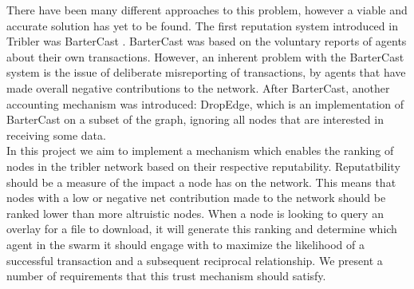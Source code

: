 \documentclass[twocolumn]{article}
\theoremstyle{definition}
\theoremstyle{theorem}
\begin{document}
\noindent There have been many different approaches to this problem, however a viable and accurate solution has yet to be found. The first reputation system introduced in Tribler was BarterCast \cite{Bartercast: A practical approach to prevent lazy freeriding in p2p networks}. BarterCast was based on the voluntary reports of agents about their own transactions. However, an inherent problem with the BarterCast system is the issue of deliberate misreporting of transactions, by agents that have made overall negative contributions to the network. After BarterCast, another accounting mechanism was introduced: DropEdge, which is an implementation of BarterCast on a subset of the graph, ignoring all nodes that are interested in receiving some data. \vspace{1em}\\

\noindent In this project we aim to implement a mechanism which enables the ranking of nodes in the tribler network based on their respective reputability. Reputatbility should be a measure of the impact a node has on the network. This means that nodes with a low or negative net contribution made to the network should be ranked lower than more altruistic nodes. When a node is looking to query an overlay for a file to download, it will generate this ranking and determine which agent in the swarm it should engage with to maximize the likelihood of a successful transaction and a subsequent reciprocal relationship. We present a number of requirements that this trust mechanism should satisfy.
\end{document}
